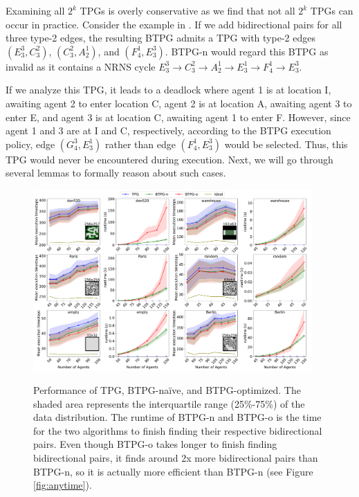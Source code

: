 \documentclass[letterpaper]{article} %
\theoremstyle{definition}
\newtheorem{definition}{Definition}
\newcommand{\rishi}[1]{\textcolor{black}{\textbf{Rishi:}}
\textcolor{purple}{#1}}
\begin{document}


Examining all $2^k$ TPGs is overly conservative as we find that not all $2^k$ TPGs can occur in practice. Consider the example in . If we add bidirectional pairs for all three type-2 edges, the resulting BTPG admits a TPG with type-2 edges $(E^3_3,C_3^2)$, $(C_3^2,A_2^1)$, and $(F^1_4,E^3_3)$. BTPG-n would regard this BTPG as invalid as it contains a NRNS cycle $E^3_3 \rightarrow C^2_3 \rightarrow A^1_2  \rightarrow E^1_3 \rightarrow F^1_4 \rightarrow E^3_3$.

If we analyze this TPG, it leads to a deadlock where agent 1 is at location I, awaiting agent 2 to enter location C, agent 2 is at location A, awaiting agent 3 to enter E, and agent 3 is at location C, awaiting agent 1 to enter F. However, since agent 1 and 3 are at I and C, respectively, according to the BTPG execution policy, edge $(G_4^3,E_3^1)$ rather than edge $(F_4^1,E_3^3)$ would be selected.
Thus, this TPG would never be encountered during execution. Next, we will go through several lemmas to formally reason about such cases.

\begin{figure}[th!]
     \centering
     \includegraphics[width=0.95\textwidth]{Figs/results.pdf}
     \label{random}
    \caption{Performance of TPG, BTPG-naïve, and BTPG-optimized. The shaded area represents the interquartile range (25\%-75\%) of the data distribution. The runtime of BTPG-n and BTPG-o is the time for the two algorithms to finish finding their respective bidirectional pairs. Even though BTPG-o takes longer to finish finding bidirectional pairs, it finds around 2x more bidirectional pairs than BTPG-n, so it is actually more efficient than BTPG-n (see Figure \ref{fig:anytime}). }
    \label{fig:comparison}
\end{figure}
\end{document}
